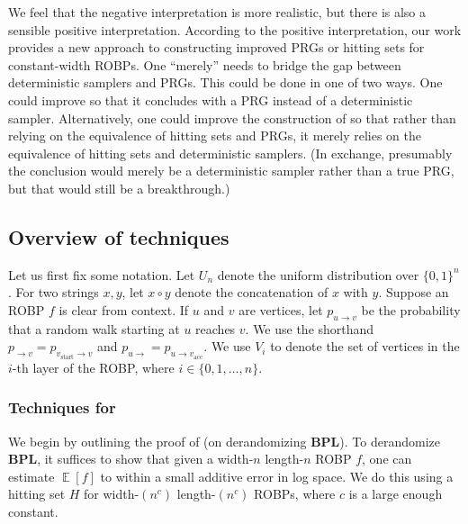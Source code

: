 \documentclass{toc}
\DeclareMathOperator*{\ExpVal}{\mathbb{E}}
\begin{document}
We feel that the negative interpretation is more realistic, but there is also a sensible positive interpretation. According to the positive interpretation, our work provides a new approach to constructing improved PRGs or hitting sets for constant-width ROBPs. One ``merely'' needs to bridge the gap between deterministic samplers and PRGs. This could be done in one of two ways. One could improve  so that it concludes with a PRG instead of a deterministic sampler. Alternatively, one could improve the construction of  so that rather than relying on the equivalence of hitting sets and PRGs, it merely relies on the equivalence of hitting sets and deterministic samplers. (In exchange, presumably the conclusion would merely be a deterministic sampler rather than a true PRG, but that would still be a breakthrough.)


\subsection{Overview of techniques}

Let us first fix some notation. Let $U_n$ denote the uniform distribution over $\{0, 1\}^n$. For two strings $x, y$, let $x \circ y$ denote the concatenation of $x$ with $y$. 
Suppose an ROBP $f$ is clear from context. If $u$ and $v$ are vertices, let $p_{u \to v}$ be the probability that a random walk starting at $u$ reaches $v$. We use the shorthand $p_{\to v} = p_{v_{\text{start}} \to v}$ and $p_{u \to} = p_{u \to v_{\text{acc}}}$. We use $V_i$ to denote the set of vertices in the $i$-th layer of the ROBP, where $i \in \{0, 1, \dots, n\}$.


\subsubsection{Techniques for } \label{sec:poly-width-techniques}

We begin by outlining the proof of  (on derandomizing $\mathbf{BPL}$). To derandomize $\mathbf{BPL}$, it suffices to show that given a width-$n$ length-$n$ ROBP $f$, one can estimate $\ExpVal[f]$ to within a small additive error in log space. We do this using a hitting set $H$ for width-$(n^c)$ length-$(n^c)$ ROBPs, where $c$ is a large enough constant.
\end{document}
